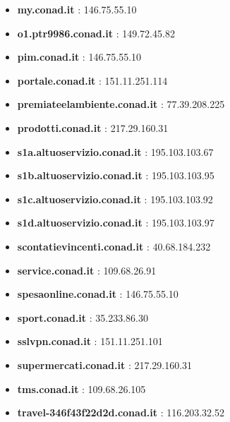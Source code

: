 \documentclass{article}
\begin{document}
\begin{itemize}
        \item \textbf{ my.conad.it }: 146.75.55.10
    
        \item \textbf{ o1.ptr9986.conad.it }: 149.72.45.82
    
        \item \textbf{ pim.conad.it }: 146.75.55.10
    
        \item \textbf{ portale.conad.it }: 151.11.251.114
    
        \item \textbf{ premiateelambiente.conad.it }: 77.39.208.225
    
        \item \textbf{ prodotti.conad.it }: 217.29.160.31
    
        \item \textbf{ s1a.altuoservizio.conad.it }: 195.103.103.67
    
        \item \textbf{ s1b.altuoservizio.conad.it }: 195.103.103.95
    
        \item \textbf{ s1c.altuoservizio.conad.it }: 195.103.103.92
    
        \item \textbf{ s1d.altuoservizio.conad.it }: 195.103.103.97
    
        \item \textbf{ scontatievincenti.conad.it }: 40.68.184.232
    
        \item \textbf{ service.conad.it }: 109.68.26.91
    
        \item \textbf{ spesaonline.conad.it }: 146.75.55.10
    
        \item \textbf{ sport.conad.it }: 35.233.86.30
    
        \item \textbf{ sslvpn.conad.it }: 151.11.251.101
    
        \item \textbf{ supermercati.conad.it }: 217.29.160.31
    
        \item \textbf{ tms.conad.it }: 109.68.26.105
    
        \item \textbf{ travel-346f43f22d2d.conad.it }: 116.203.32.52
    

\end{itemize}
\end{document}
